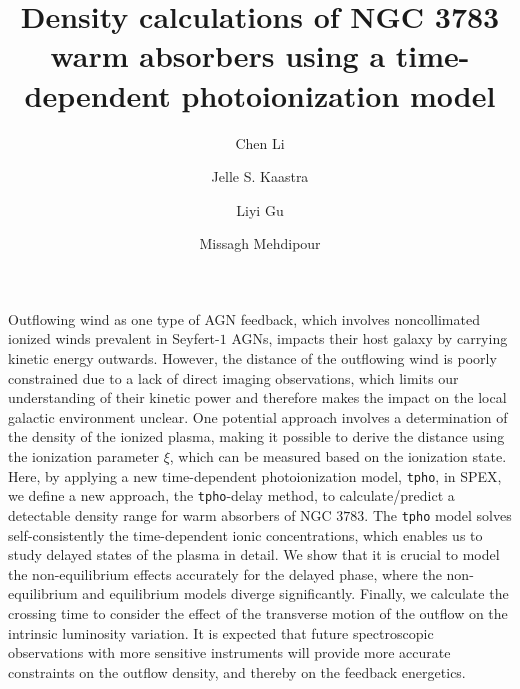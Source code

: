 \documentclass{aa}
\begin{document}
 

   \title{Density calculations of NGC 3783 warm absorbers using a time-dependent photoionization model}


   \author{Chen Li
          \and
          Jelle S. Kaastra
          \and
          Liyi Gu
          \and
          Missagh Mehdipour
          }


   \date{}

 
  \abstract
  {
Outflowing wind as one type of AGN feedback, which involves noncollimated ionized winds prevalent in Seyfert-$1$ AGNs, impacts their host galaxy by carrying kinetic energy outwards.
However, the distance of the outflowing wind is poorly constrained due to a lack of direct imaging observations, which limits our understanding of their kinetic power and therefore makes the impact on the local galactic environment unclear.  
One potential approach involves a determination of the density of the ionized plasma, making it possible to derive the distance using the ionization parameter $\xi$, which can be measured based on the ionization state.
Here, by applying a new time-dependent photoionization model, \texttt{tpho}, in SPEX, we define a new approach, the \texttt{tpho}-delay method, to calculate/predict a detectable density range for warm absorbers of NGC $3783$.
The \texttt{tpho} model solves self-consistently the time-dependent ionic concentrations, which enables us to study delayed states of the plasma in detail.
We show that it is crucial to model the non-equilibrium effects accurately for the delayed phase, where the non-equilibrium and equilibrium models diverge significantly.
Finally, we calculate the crossing time to consider the effect of the transverse motion of the outflow on the intrinsic luminosity variation.
It is expected that future spectroscopic observations with more sensitive instruments will provide more accurate constraints on the outflow density, and thereby on the feedback energetics.
}
\end{document}
